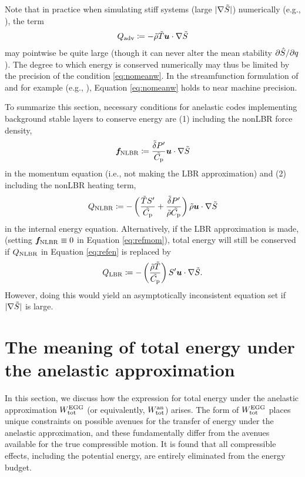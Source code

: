 \documentclass[12pt]{article}
\newcommand{\heatlbr}{Q_{\rm LBR}}
\newcommand{\heatnlbr}{Q_{\rm NLBR}}
\newcommand{\forcenlbr}{\bm{f}_{\rm NLBR}}
\newcommand{\heatadv}{Q_{\rm adv}}
\newcommand{\anwtot}{W^{\rm an}_{\rm tot}}
\newcommand{\eggwtot}{W^{\rm EGG}_{\rm tot}}
\begin{document}
Note that in practice when simulating stiff systems (large $|\nabla\tilde{S}|$) numerically (e.g., \citealt{Guerrero2016a,Matilsky2022,Matilsky2024}), the term 
\begin{align}
	\heatadv\define  -\rhotilde\tmptilde\ugrad\entrtilde
\end{align}
may pointwise be quite large (though it can never alter the mean stability $\partial\hat{S}/\partial q$). The degree to which energy is conserved numerically may thus be limited by the precision of the condition \eqref{eq:nomeanw}. In the streamfunction formulation of {\ash} and {\rayleigh} for example (e.g., \citealt{Clune1999,Featherstone2016a}), Equation \eqref{eq:nomeanw} holds to near machine precision. 

To summarize this section, necessary conditions for anelastic codes implementing background stable layers to conserve energy are (1) including the nonLBR force density,
\begin{align}\label{eq:nlbrmomref}
	\forcenlbr \define\frac{\deltatilde  \prsprime}{\cptilde} \vecu\cdot \nabla\entrtilde 
\end{align}
in the momentum equation (i.e., not making the LBR approximation) and (2) including the nonLBR heating term,
\begin{align}\label{eq:nlbrheatref}
	\heatnlbr \define -  \left(\frac{\tmptilde \entrprime}{\cptilde} + \frac{\deltatilde  \prsprime}{\rhotilde\cptilde}\right)  \rhotilde \ugrad\entrtilde
\end{align}
in the internal energy equation. Alternatively, if the LBR approximation is made, (setting $\forcenlbr\equiv0$ in Equation \eqref{eq:refmom}), total energy will still be conserved if $\heatnlbr$ in Equation \eqref{eq:refen} is replaced by
\begin{align}\label{eq:lbrheating}
	\heatlbr\define - \left(\frac{\rhotilde\tmptilde}{\cptilde} \right) \entrprime\ugrad\entrtilde.
\end{align}
However, doing this would yield an asymptotically inconsistent equation set if $|\nabla\tilde{S}|$ is large. 

\section{The meaning of total energy under the anelastic approximation}\label{sec:meaningtote}
In this section, we discuss how the expression for total energy under the anelastic approximation $\eggwtot$ (or equivalently, $\anwtot$) arises. The form of $\eggwtot$ places unique constraints on possible avenues for the transfer of energy under the anelastic approximation, and these fundamentally differ from the avenues available for the true compressible motion. It is found that all compressible effects, including the potential energy, are entirely eliminated from the energy budget. 
\end{document}
